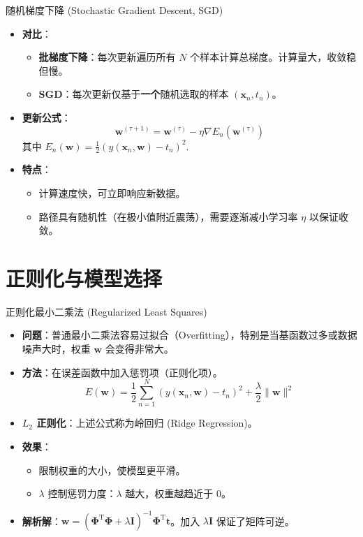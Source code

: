 \documentclass[12pt, aspectratio=169]{beamer}
\newcommand{\vect}[1]{\mathbf{#1}}
\newcommand{\mat}[1]{\mathbf{#1}}
\begin{document}
\begin{frame}{随机梯度下降 (Stochastic Gradient Descent, SGD)}
    \begin{itemize}
        \item \textbf{对比}：
        \begin{itemize}
            \item \textbf{批梯度下降}：每次更新遍历所有 $N$ 个样本计算总梯度。计算量大，收敛稳但慢。
            \item \textbf{SGD}：每次更新仅基于\textbf{一个}随机选取的样本 $(\vect{x}_n, t_n)$。
        \end{itemize}
        \item \textbf{更新公式}：
        $$ \vect{w}^{(\tau+1)} = \vect{w}^{(\tau)} - \eta \nabla E_n(\vect{w}^{(\tau)}) $$
        其中 $E_n(\vect{w}) = \frac{1}{2}(y(\vect{x}_n, \vect{w}) - t_n)^2$. 
        \item \textbf{特点}：
        \begin{itemize}
            \item 计算速度快，可立即响应新数据。
            \item 路径具有随机性（在极小值附近震荡），需要逐渐减小学习率 $\eta$ 以保证收敛。
        \end{itemize}
    \end{itemize}
\end{frame}

\section{正则化与模型选择}

\begin{frame}{正则化最小二乘法 (Regularized Least Squares)}
    \begin{itemize}
        \item \textbf{问题}：普通最小二乘法容易过拟合（Overfitting），特别是当基函数过多或数据噪声大时，权重 $\vect{w}$ 会变得非常大。
        \item \textbf{方法}：在误差函数中加入惩罚项（正则化项）。
        $$ E(\vect{w}) = \frac{1}{2}\sum_{n=1}^N (y(\vect{x}_n, \vect{w}) - t_n)^2 + \frac{\lambda}{2} \|\vect{w}\|^2 $$
        \item \textbf{$L_2$ 正则化}：上述公式称为岭回归 (Ridge Regression)。
        \item \textbf{效果}：
        \begin{itemize}
            \item 限制权重的大小，使模型更平滑。
            \item $\lambda$ 控制惩罚力度：$\lambda$ 越大，权重越趋近于 0。
        \end{itemize}
        \item \textbf{解析解}：$\vect{w} = (\boldsymbol{\Phi}^{\mathrm{T}} \boldsymbol{\Phi} + \lambda \mat{I})^{-1} \boldsymbol{\Phi}^{\mathrm{T}} \vect{t}$。加入 $\lambda \mat{I}$ 保证了矩阵可逆。
    \end{itemize}
\end{frame}
\end{document}
